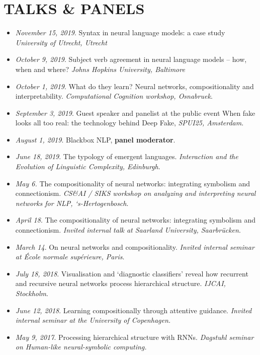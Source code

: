 \section{TALKS \& PANELS}

\begin{itemize}
\setlength\itemsep{5pt}
    \item \textit{November 15, 2019}. Syntax in neural language models: a case study \textit{University of Utrecht, Utrecht}
    \item \textit{October 9, 2019}. Subject verb agreement in neural language models -- how, when and where? \textit{Johns Hopkins University, Baltimore}
    \item \textit{October 1, 2019}. What do they learn? Neural networks, compositionality and interpretability. \textit{Computational Cognition workshop, Osnabruek}.
    \item \textit{September 3, 2019}. Guest speaker and panelist at the public event When fake looks all too real: the technology behind Deep Fake, \textit{SPUI25, Amsterdam}.
    \item \textit{August 1, 2019}. Blackbox NLP, \textbf{panel moderator}.
    \item \textit{June 18, 2019}. The typology of emergent languages. \textit{Interaction and the Evolution of Linguistic Complexity, Edinburgh}.
    \item \textit{May 6.} The compositionality of neural networks: integrating symbolism and connectionism. \textit{CS\&AI / SIKS workshop on analyzing and interpreting neural networks for NLP, ‘s-Hertogenbosch}.
    \item \textit{April 18}. The compositionality of neural networks: integrating symbolism and connectionism. \textit{Invited internal talk at Saarland University, Saarbrücken}.
    \item \textit{March 14}. On neural networks and compositionality. \textit{Invited internal seminar at École normale supérieure, Paris}.
    \item \textit{July 18, 2018}. Visualisation and ‘diagnostic classifiers’ reveal how recurrent and recursive neural networks process hierarchical structure. \textit{IJCAI, Stockholm}.
    \item \textit{June 12, 2018}. Learning compositionally through attentive guidance. \textit{Invited internal seminar at the University of Copenhagen.}
    \item \textit{May 9, 2017}. Processing hierarchical structure with RNNs.\textit{ Dagstuhl seminar on Human-like neural-symbolic computing.}

\end{itemize}
